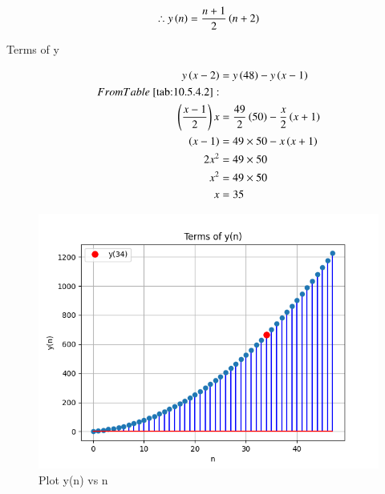 \documentclass[journal,12pt,twocolumn]{IEEEtran}
\theoremstyle{remark}
\begin{document}
\begin{align}
    \therefore y\left(n\right)=\frac{n+1}{2}\left(n+2\right)
\end{align}

\begin{table}[ht]
    \centering
    \def\arraystretch{1.5}
    
   \caption{Terms of y}
   \label{tab:10.5.4.2}
\end{table}

\begin{align}
y\brak{x-2}&=y\brak{48}-y\brak{x-1}\\
From \tabref{tab:10.5.4.2}:\\
\brak{\frac{x-1}{2}}x&=\frac{49}{2}\brak{50}-\frac{x}{2}\brak{x+1}\\
\brak{x-1}&=49\times50 - x\brak{x+1}\\
2x^{2}&=49\times50\\
x^{2}&=49\times50\\
x&=35
\end{align}

\newpage
\begin{figure}[h]
    
    \includegraphics[width=\columnwidth]{figs/fig1.png}
    \caption{Plot y(n) vs n}
\end{figure}

 
\end{document}

